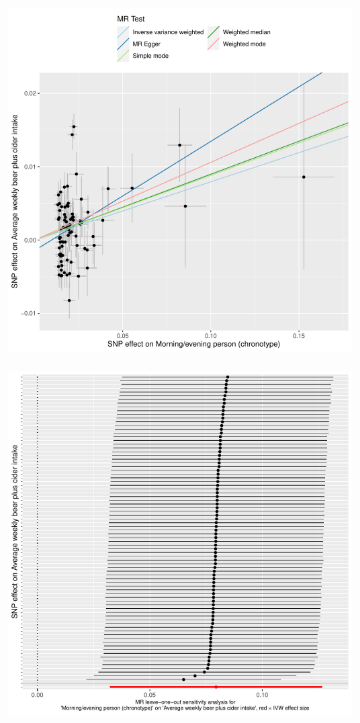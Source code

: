 \documentclass[journal,article,submit,moreauthors,pdftex]{Definitions/mdpi}
\begin{document}
\begin{figure}[htbp]
\begin{subfigure}{.5\linewidth}
\centering
	\includegraphics[width=\linewidth]{Figs/Analysis2/Morning_evening_person_(chronotype)_vs_Average_weekly_beer_plus_cider_intake.Scatterplots.pdf}
\caption{}
\label{beerScatter}
\end{subfigure}
\begin{subfigure}{.5\linewidth}
\centering
	\includegraphics[width=\linewidth,keepaspectratio]{Figs/Analysis2/Morning_evening_person_(chronotype)_vs_Average_weekly_beer_plus_cider_intake.LOOplots.pdf}

\end{subfigure}
\end{figure}
\end{document}
